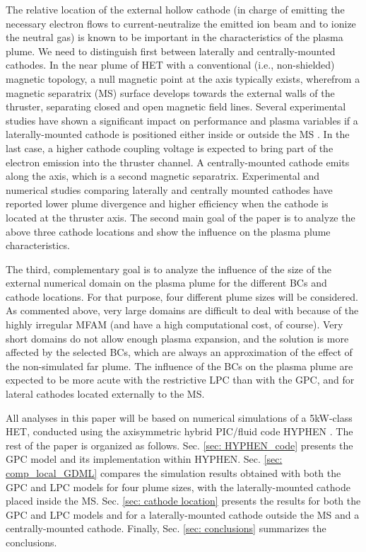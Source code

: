 \documentclass[%
 aip,
cha,
 amsmath,amssymb,
 reprint,%
]{revtex4-1}
\begin{document}
The relative location of the external hollow cathode (in charge of emitting the necessary electron flows to current-neutralize the emitted ion beam and to ionize the neutral gas) is known to be important in the characteristics of the plasma plume. We need to distinguish first between laterally and centrally-mounted cathodes.
In the near plume of HET with a conventional (i.e., non-shielded) magnetic topology, a null magnetic point at the axis typically exists, wherefrom a magnetic separatrix (MS) surface develops towards the external walls of the thruster, separating closed and open magnetic field lines. 
Several experimental studies have shown a significant impact on performance and plasma variables if a laterally-mounted cathode is positioned either inside or outside the MS \cite{somm11b,tura16,yu17,ding18}. In the last case, a higher cathode coupling voltage is expected to bring part of the electron emission into the thruster channel.
A centrally-mounted cathode emits along the axis, which is a second magnetic separatrix. Experimental \cite{jame07,hofe08b} and numerical \cite{cho17,cao20} studies 
comparing laterally and centrally mounted cathodes have reported lower plume divergence and higher efficiency when the cathode is located at the thruster axis. 
The second main goal of the paper is to analyze the above three cathode locations and show the influence on the plasma plume characteristics.

The third, complementary goal is to analyze the influence of the size of the external numerical domain on the plasma plume
for the different BCs and cathode locations.  
For that purpose, four different plume sizes will be considered.
As commented above, very large domains are difficult to deal with because of the highly irregular MFAM (and have a high computational cost, of course). Very short domains do not allow enough plasma expansion, and the solution is more affected by the selected BCs, which are always an approximation of the effect of the non-simulated far plume. The influence of the BCs on the plasma plume are expected to be more acute with the restrictive LPC than with the GPC, and for lateral cathodes located externally to the MS.


All analyses in this paper will be based on numerical simulations of a 5kW-class HET, 
conducted using the axisymmetric hybrid PIC/fluid code HYPHEN \cite{domi19a,domi19b,pera22b}.
The rest of the paper is organized as follows. Sec. \ref{sec: HYPHEN_code} presents the GPC model and its implementation within HYPHEN. Sec. \ref{sec: comp_local_GDML} compares the simulation results obtained with both the GPC and LPC models for four plume sizes, with the laterally-mounted cathode placed inside the MS. Sec. \ref{sec: cathode location} presents the results for both the GPC and LPC models and for a laterally-mounted cathode outside the MS and a centrally-mounted cathode. Finally, Sec. \ref{sec: conclusions} summarizes the conclusions.
\end{document}
